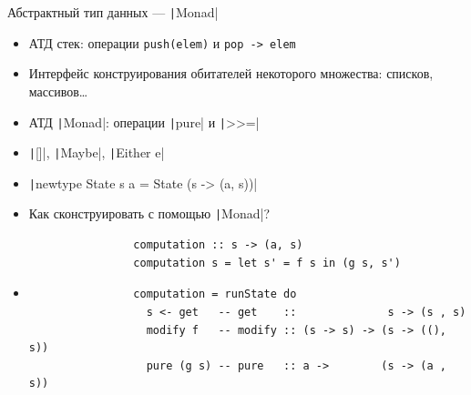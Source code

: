     \begin{frame}[fragile]{Абстрактный тип данных --- \texttt|Monad|}
        \vspace{-0.5em}
        \begin{itemize}
            \item[\eg] АТД стек: операции \texttt{push(elem)} и \texttt{pop -> elem}
            \item Интерфейс конструирования обитателей некоторого множества: списков, массивов\ldots
            \item АТД \texttt|Monad|: операции \texttt|pure| и \texttt|>>=|
            \item[\eg] \texttt|[]|, \texttt|Maybe|, \texttt|Either e|
            \item[\eg] \texttt|newtype State s a = State (s -> (a, s))|
            \item[\todo] Как сконструировать с помощью \texttt|Monad|?
            \begin{verbatim}
                computation :: s -> (a, s)
                computation s = let s' = f s in (g s, s')
            \end{verbatim}
            \item[\answer] \pause
            \begin{verbatim}
                computation = runState do
                  s <- get   -- get    ::              s -> (s , s)
                  modify f   -- modify :: (s -> s) -> (s -> ((), s))
                  pure (g s) -- pure   :: a ->        (s -> (a , s))
            \end{verbatim}
        \end{itemize}
    \end{frame}

